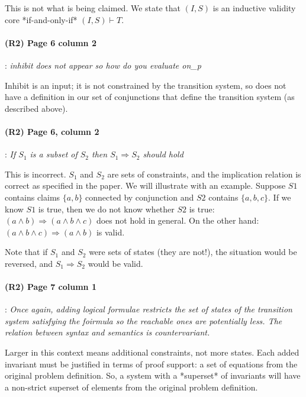 \documentclass{article}
\begin{document}
\noindent This is not what is being claimed. We state that $(I, S)$ is an
inductive validity core *if-and-only-if* $(I, S) \vdash T$.

\paragraph{(R2) Page 6 column 2}: \textit{inhibit does not appear so how do you evaluate
on\_p}
\vspace{0.05in}

\noindent Inhibit is an input; it is not constrained by the transition
system, so does not have a definition in our set of conjunctions
that define the transition system (as described above).

\newcommand{\implies}[0]{\Rightarrow}
\newcommand{\mkeyword}[1]{\mbox{\texttt{#1}}}

\paragraph{(R2) Page 6, column 2}: \textit{If $S_1$ is a subset of $S_2$ then $S_1 \implies S_2$ should hold}
\vspace{0.05in}

\noindent This is incorrect. $S_1$ and $S_2$ are sets of constraints, and the implication relation is correct as specified in the paper.  We will illustrate with an example. Suppose $S1$ contains claims $\{a, b\}$ connected by conjunction and $S2$ contains $\{a,
b, c\}$.  If we know $S1$ is true, then we do not know whether $S2$ is true: $(a \land
b) \implies (a \land b \land c)$ does not hold in general.  On the other hand: $(a \land b \land c) \implies (a \land b)$ is valid.

Note that if $S_1$ and $S_2$ were sets of states (they are not!), the situation would be reversed, and $S_1 \implies S_2$ would be valid.


\paragraph{(R2) Page 7 column 1}: 
\textit{Once again, adding logical formulae restricts the set of states of the transition system satisfying the foirmula so
the reachable ones are potentially less. The relation between syntax and
semantics is countervariant.}
\vspace{0.05in}

\noindent Larger in this context means additional constraints, not more states.  Each added invariant must be justified in terms of proof support: a set of equations from the original problem definition. So, a system with a *superset* of invariants will have a non-strict superset of elements from the original problem definition.
\end{document}
